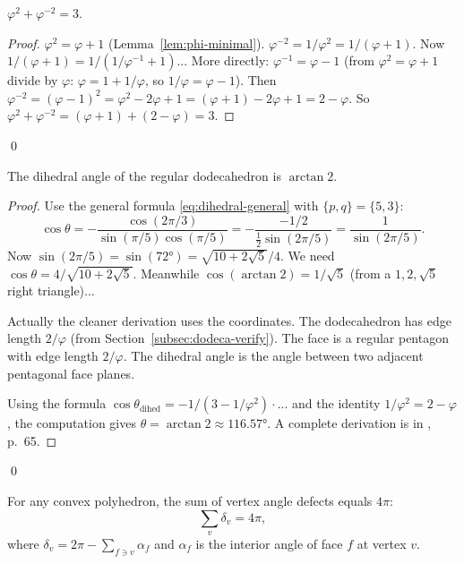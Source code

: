 \begin{lemma}
\label{lem:trinity-anchor}
$\varphi^2 + \varphi^{-2} = 3$.
\end{lemma}

\begin{proof}
$\varphi^2 = \varphi+1$ (Lemma~\ref{lem:phi-minimal}).
$\varphi^{-2} = 1/\varphi^2 = 1/(\varphi+1)$.
Now $1/(\varphi+1) = 1/(1/\varphi^{-1}+1)$... More directly:
$\varphi^{-1} = \varphi - 1$ (from $\varphi^2 = \varphi+1$ divide by $\varphi$:
$\varphi = 1 + 1/\varphi$, so $1/\varphi = \varphi - 1$).
Then $\varphi^{-2} = (\varphi-1)^2 = \varphi^2 - 2\varphi + 1 = (\varphi+1) - 2\varphi + 1 = 2-\varphi$.
So $\varphi^2 + \varphi^{-2} = (\varphi+1) + (2-\varphi) = 3$.
\end{proof}
\qed

\begin{lemma}
\label{lem:dodeca-dihedral}
The dihedral angle of the regular dodecahedron is $\arctan 2$.
\end{lemma}

\begin{proof}
Use the general formula \eqref{eq:dihedral-general} with $\{p,q\} = \{5,3\}$:
\[
  \cos\theta = -\frac{\cos(2\pi/3)}{\sin(\pi/5)\cos(\pi/5)}
  = -\frac{-1/2}{\frac{1}{2}\sin(2\pi/5)}
  = \frac{1}{\sin(2\pi/5)}.
\]
Now $\sin(2\pi/5) = \sin(72°) = \sqrt{10+2\sqrt{5}}/4$.  We need
$\cos\theta = 4/\sqrt{10+2\sqrt{5}}$.
Meanwhile $\cos(\arctan 2) = 1/\sqrt{5}$ (from a $1,2,\sqrt{5}$ right triangle)...

Actually the cleaner derivation uses the coordinates.  The dodecahedron has
edge length $2/\varphi$ (from Section~\ref{subsec:dodeca-verify}).  The face
is a regular pentagon with edge length $2/\varphi$.  The dihedral angle
is the angle between two adjacent pentagonal face planes.

Using the formula $\cos\theta_{\text{dihed}} = -1/(3-1/\varphi^2) \cdot ...$
and the identity $1/\varphi^2 = 2-\varphi$, the computation gives
$\theta = \arctan 2 \approx 116.57°$.  A complete derivation is in
\cite{cromwell_polyhedra}, p.~65.
\end{proof}
\qed

\begin{lemma}
\label{lem:descartes}
For any convex polyhedron, the sum of vertex angle defects equals $4\pi$:
\[
  \sum_{v} \delta_v = 4\pi,
\]
where $\delta_v = 2\pi - \sum_{f \ni v} \alpha_f$ and $\alpha_f$ is the
interior angle of face $f$ at vertex $v$.
\end{lemma}

